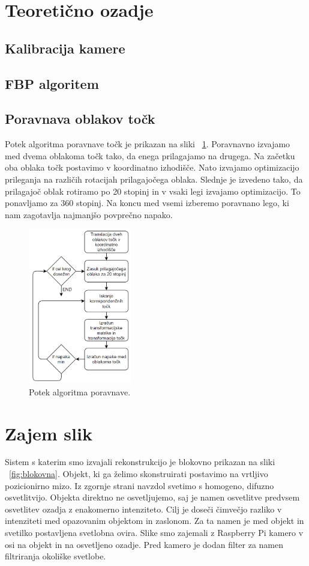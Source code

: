 \documentclass[journal,a4paper,twoside]{sty/IEEEtran}
\begin{document}
\section{Teoretično ozadje}

\subsection{Kalibracija kamere}
\subsection{FBP algoritem}
\subsection{Poravnava oblakov točk}
%
Potek algoritma poravnave točk je prikazan na sliki ~\ref{fig:alg_poravnava}. Poravnavno izvajamo med dvema oblakoma točk tako, da enega prilagajamo na drugega. Na začetku oba oblaka točk postavimo v koordinatno izhodišče. Nato izvajamo optimizacijo prileganja na različih rotacijah prilagajočega oblaka. Slednje je izvedeno tako, da prilagajoč oblak rotiramo po 20 stopinj in v vsaki legi izvajamo optimizacijo. To ponavljamo za 360 stopinj. Na koncu med vsemi izberemo poravnano lego, ki nam zagotavlja najmanjšo povprečno napako. 

\begin{figure}[H]
	\centerline{\includegraphics[width=4.5cm]{fig/alg_poravnava}}
	\caption{Potek algoritma poravnave.}
	\label{fig:alg_poravnava}
\end{figure}

\section{Zajem slik}
Sistem s katerim smo izvajali rekonstrukcijo je blokovno prikazan na sliki ~\ref{fig:blokovna}. Objekt, ki ga želimo skonstruirati postavimo na vrtljivo pozicionirno mizo. Iz zgornje strani navzdol svetimo s homogeno, difuzno osvetlitvijo. Objekta direktno ne osvetljujemo, saj je namen osvetlitve predvsem osvetlitev ozadja z enakomerno intenziteto. Cilj je doseči čimvečjo razliko v intenziteti med opazovanim objektom in zaslonom. Za ta namen je med objekt in svetilko postavljena svetlobna ovira. Slike smo zajemali z Raspberry Pi kamero v osi na objekt in na osvetljeno ozadje. Pred kamero je dodan filter za namen filtriranja okoliške svetlobe.
\end{document}
